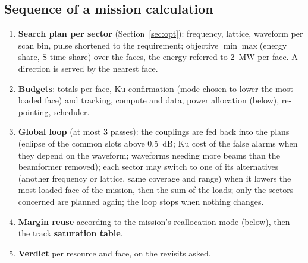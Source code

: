 \documentclass[11pt,a4paper]{article}
\begin{document}
\subsection{Sequence of a mission calculation}
\begin{enumerate}
  \item \textbf{Search plan per sector} (Section~\ref{sec:opt}): frequency, lattice, waveform per scan bin, pulse
        shortened to the requirement; objective $\min\max$(energy share, S time share) over the faces, the energy
        referred to \SI{2}{MW} per face. A direction is served by the nearest face.
  \item \textbf{Budgets}: totals per face, Ku confirmation (mode chosen to lower the most loaded face) and tracking,
        compute and data, power allocation (below), re-pointing, scheduler.
  \item \textbf{Global loop} (at most 3 passes): the couplings are fed back into the plans (eclipse of the common
        slots above \SI{0.5}{dB}; Ku cost of the false alarms when they depend on the waveform; waveforms needing more
        beams than the beamformer removed); each sector may switch to one of its alternatives (another frequency or
        lattice, same coverage and range) when it lowers the most loaded face of the mission, then the sum of the
        loads; only the sectors concerned are planned again; the loop stops when nothing changes.
  \item \textbf{Margin reuse} according to the mission's reallocation mode (below), then the track
        \textbf{saturation table}.
  \item \textbf{Verdict} per resource and face, on the revisits asked.
\end{enumerate}
\end{document}
